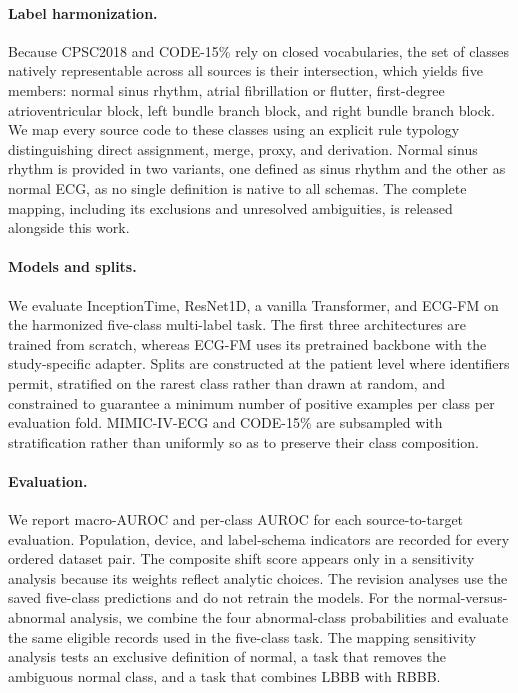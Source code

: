 \documentclass[conference]{IEEEtran}
\begin{document}
\paragraph{Label harmonization.} Because CPSC2018 and CODE-15\% rely on closed vocabularies, the set of classes natively representable across all sources is their intersection, which yields five members: normal sinus rhythm, atrial fibrillation or flutter, first-degree atrioventricular block, left bundle branch block, and right bundle branch block. We map every source code to these classes using an explicit rule typology distinguishing direct assignment, merge, proxy, and derivation. Normal sinus rhythm is provided in two variants, one defined as sinus rhythm and the other as normal ECG, as no single definition is native to all schemas. The complete mapping, including its exclusions and unresolved ambiguities, is released alongside this work.

\paragraph{Models and splits.} We evaluate InceptionTime, ResNet1D, a vanilla Transformer, and ECG-FM on the harmonized five-class multi-label task. The first three architectures are trained from scratch, whereas ECG-FM uses its pretrained backbone with the study-specific adapter. Splits are constructed at the patient level where identifiers permit, stratified on the rarest class rather than drawn at random, and constrained to guarantee a minimum number of positive examples per class per evaluation fold. MIMIC-IV-ECG and CODE-15\% are subsampled with stratification rather than uniformly so as to preserve their class composition.

\paragraph{Evaluation.} We report macro-AUROC and per-class AUROC for each source-to-target evaluation. Population, device, and label-schema indicators are recorded for every ordered dataset pair. The composite shift score appears only in a sensitivity analysis because its weights reflect analytic choices. The revision analyses use the saved five-class predictions and do not retrain the models. For the normal-versus-abnormal analysis, we combine the four abnormal-class probabilities and evaluate the same eligible records used in the five-class task. The mapping sensitivity analysis tests an exclusive definition of normal, a task that removes the ambiguous normal class, and a task that combines LBBB with RBBB.
\end{document}
